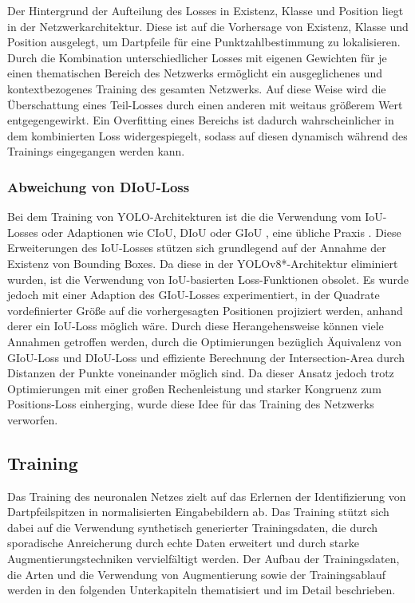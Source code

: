 Der Hintergrund der Aufteilung des Losses in Existenz, Klasse und Position liegt in der Netzwerkarchitektur. Diese ist auf die Vorhersage von Existenz, Klasse und Position ausgelegt, um Dartpfeile für eine Punktzahlbestimmung zu lokalisieren. Durch die Kombination unterschiedlicher Losses mit eigenen Gewichten für je einen thematischen Bereich des Netzwerks ermöglicht ein ausgeglichenes und kontextbezogenes Training des gesamten Netzwerks. Auf diese Weise wird die Überschattung eines Teil-Losses durch einen anderen mit weitaus größerem Wert entgegengewirkt. Ein Overfitting eines Bereichs ist dadurch wahrscheinlicher in dem kombinierten Loss widergespiegelt, sodass auf diesen dynamisch während des Trainings eingegangen werden kann.

\subsubsection{Abweichung von DIoU-Loss}

Bei dem Training von YOLO-Architekturen ist die die Verwendung vom IoU-Losses oder Adaptionen wie CIoU, DIoU oder GIoU \cite{diou_losses}, eine übliche Praxis \cite{yolov1,yolov8_paper,yolo_training_giou}. Diese Erweiterungen des IoU-Losses stützen sich grundlegend auf der Annahme der Existenz von Bounding Boxes. Da diese in der YOLOv8*-Architektur eliminiert wurden, ist die Verwendung von IoU-basierten Loss-Funktionen obsolet. Es wurde jedoch mit einer Adaption des GIoU-Losses experimentiert, in der Quadrate vordefinierter Größe auf die vorhergesagten Positionen projiziert werden, anhand derer ein IoU-Loss möglich wäre. Durch diese Herangehensweise können viele Annahmen getroffen werden, durch die Optimierungen bezüglich Äquivalenz von GIoU-Loss und DIoU-Loss und effiziente Berechnung der Intersection-Area durch Distanzen der Punkte voneinander möglich sind. Da dieser Ansatz jedoch trotz Optimierungen mit einer großen Rechenleistung und starker Kongruenz zum Positions-Loss einherging, wurde diese Idee für das Training des Netzwerks verworfen.


\subsection{Training}
\label{sec:nn_training}

Das Training des neuronalen Netzes zielt auf das Erlernen der Identifizierung von Dartpfeilspitzen in normalisierten Eingabebildern ab. Das Training stützt sich dabei auf die Verwendung synthetisch generierter Trainingsdaten, die durch sporadische Anreicherung durch echte Daten erweitert und durch starke Augmentierungstechniken vervielfältigt werden. Der Aufbau der Trainingsdaten, die Arten und die Verwendung von Augmentierung sowie der Trainingsablauf werden in den folgenden Unterkapiteln thematisiert und im Detail beschrieben.

